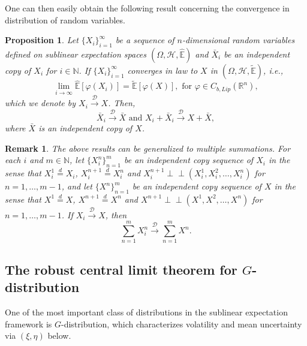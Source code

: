 \documentclass[a4paper,oneside,10pt]{article}%
\newtheorem{proposition}[theorem]{Proposition}
\newtheorem{remark}[theorem]{Remark}
\numberwithin{equation}{section}
\begin{document}
One can then easily obtain the following result concerning the convergence in
distribution of random variables.

\begin{proposition}
\label{independent copy converge in law}Let $\{X_{i}\}_{i=1}^{\infty}$ be a
sequence of $n$-dimensional random variables defined on sublinear expectation
spaces $(\Omega,\mathcal{H},\mathbb{\hat{E}})$ and $\bar{X}_{i}$ be an
independent copy of $X_{i}$ for $i\in \mathbb{N}$. If $\{X_{i}\}_{i=1}^{\infty
}$ converges in law to $X$ in $(\Omega,\mathcal{H},\mathbb{\tilde{E}})$,
i.e.,
\[
\lim_{i\rightarrow \infty}\mathbb{\hat{E}}[\varphi(X_{i})]=\mathbb{\tilde{E}
}[\varphi(X)],\text{ for }\varphi \in C_{b,Lip}(\mathbb{R}^{n}),
\]
which we denote by $X_{i}\overset{\mathcal{D}}{\rightarrow}X$. Then,
\[
\bar{X}_{i}\overset{\mathcal{D}}{\rightarrow}\bar{X}\text{\ and \ }X_{i}%
+\bar{X}_{i}\overset{\mathcal{D}}{\rightarrow}X+\bar{X},
\]
where $\bar{X}$ is an independent copy of $X$.
\end{proposition}

\begin{remark}
\label{ramark i.i.d.} The above results can be generalized to multiple
summations. For each $i$ and $m\in \mathbb{N}$, let $\{X_{i}^{n}\}_{n=1}^{m}$
be an independent copy sequence of $X_{i}$ in the sense that $X_{i}%
^{1}\overset{d}{=}X_{i}$, $X_{i}^{n+1}\overset{d}{=}X_{i}^{n}$ and
$X_{i}^{n+1}\perp \! \! \! \perp(X_{i}^{1},X_{i}^{2},\ldots,X_{i}^{n})$ for
$n=1,\ldots,m-1$, and let $\{X^{n}\}_{n=1}^{m}$ be an independent copy
sequence of $X$ in the sense that $X^{1}\overset{d}{=}X$, $X^{n+1}\overset
{d}{=}X^{n}$ and $X^{n+1}\perp \! \! \! \perp(X^{1},X^{2},\ldots,X^{n})$ for
$n=1,\ldots,m-1$. If $X_{i}\overset{\mathcal{D}}{\rightarrow}X$, then
\[
\sum_{n=1}^{m}X_{i}^{n}\overset{\mathcal{D}}{\rightarrow}\sum_{n=1}^{m}X^{n}.
\]

\end{remark}

\subsection{The robust central limit theorem for $G$-distribution}

One of the most important class of distributions in the sublinear expectation
framework is $G$-distribution, which characterizes volatility and mean
uncertainty via $(\xi,\eta)$ below.
\end{document}

